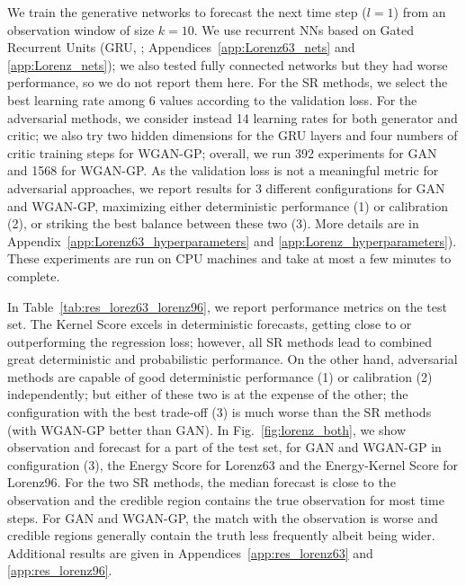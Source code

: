 \documentclass[twoside,11pt]{article}
\begin{document}
	
	
	
	We train the generative networks to forecast the next time step ($ l=1 $) from an observation window of size $ k=10 $. We use recurrent NNs based on Gated Recurrent Units (GRU, \citealp{cho2014properties}; Appendices~\ref{app:Lorenz63_nets} and \ref{app:Lorenz_nets}); we also tested fully connected networks but they had worse performance, so we do not report them here. For the SR methods, we select the best learning rate among 6 values according to the validation loss. For the adversarial methods, we consider instead 14 learning rates for both generator and critic; we also try two hidden dimensions for the GRU layers and four numbers of critic training steps for WGAN-GP; overall, we run 392 experiments for GAN and 1568 for WGAN-GP. As the validation loss is not a meaningful metric for adversarial approaches, we report results for 3 different configurations for GAN and WGAN-GP, maximizing either deterministic performance (1) or calibration (2), or striking the best balance between these two (3). More details are in Appendix~\ref{app:Lorenz63_hyperparameters} and \ref{app:Lorenz_hyperparameters}). These experiments are run on CPU machines and take at most a few minutes to complete.
	
	
	
	
	
	
	
	
	
	In Table~\ref{tab:res_lorez63_lorenz96}, we report performance metrics on the test set.
	The Kernel Score excels in deterministic forecasts, getting close to or outperforming the regression loss; however, all SR methods lead to combined great deterministic and probabilistic performance. On the other hand, adversarial methods are capable of good deterministic performance (1) or calibration (2) independently; but either of these two is at the expense of the other; the configuration with the best trade-off (3) is much worse than the SR methods (with WGAN-GP better than GAN).
	In Fig.~\ref{fig:lorenz_both}, we show observation and forecast for a part of the test set, for GAN and WGAN-GP in configuration (3), the Energy Score for Lorenz63 and the Energy-Kernel Score for Lorenz96.
	For the two SR methods, the median forecast is close to the observation and the credible region contains the true observation for most time steps. For GAN and WGAN-GP, the match with the observation is worse and credible regions generally contain the truth less frequently albeit being wider.
	Additional results are given in Appendices~\ref{app:res_lorenz63} and \ref{app:res_lorenz96}.
	
\end{document}
